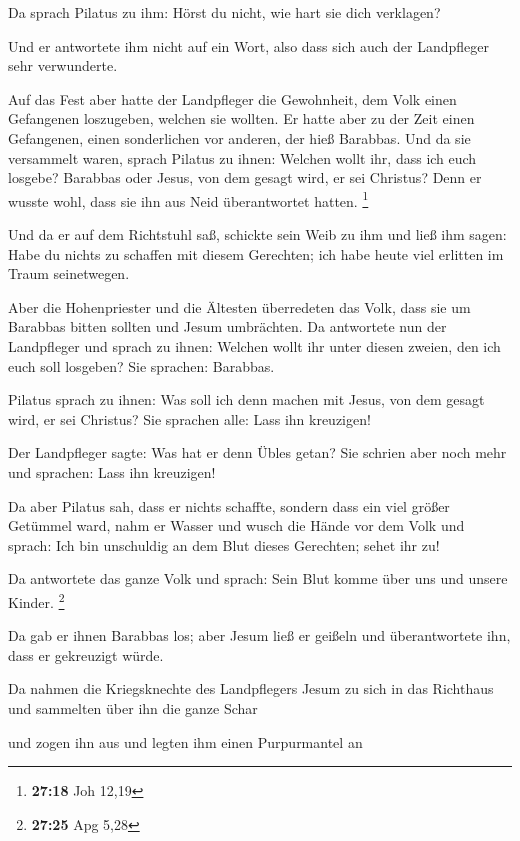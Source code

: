  Da sprach Pilatus zu ihm: Hörst du nicht, wie hart sie
dich verklagen?

 Und er antwortete ihm nicht auf ein Wort, also dass sich
auch der Landpfleger sehr verwunderte.

 Auf das Fest aber hatte der Landpfleger die Gewohnheit,
dem Volk einen Gefangenen loszugeben, welchen sie wollten. 
Er hatte aber zu der Zeit einen Gefangenen, einen sonderlichen vor
anderen, der hieß Barabbas.  Und da sie versammelt waren,
sprach Pilatus zu ihnen: Welchen wollt ihr, dass ich euch losgebe?
Barabbas oder Jesus, von dem gesagt wird, er sei Christus? 
Denn er wusste wohl, dass sie ihn aus Neid überantwortet hatten.
\footnote{\textbf{27:18} Joh 12,19}

 Und da er auf dem Richtstuhl saß, schickte sein Weib zu
ihm und ließ ihm sagen: Habe du nichts zu schaffen mit diesem Gerechten;
ich habe heute viel erlitten im Traum seinetwegen.

 Aber die Hohenpriester und die Ältesten überredeten das
Volk, dass sie um Barabbas bitten sollten und Jesum umbrächten.
 Da antwortete nun der Landpfleger und sprach zu ihnen:
Welchen wollt ihr unter diesen zweien, den ich euch soll losgeben? Sie
sprachen: Barabbas.

 Pilatus sprach zu ihnen: Was soll ich denn machen mit
Jesus, von dem gesagt wird, er sei Christus? Sie sprachen alle: Lass ihn
kreuzigen!

 Der Landpfleger sagte: Was hat er denn Übles getan? Sie
schrien aber noch mehr und sprachen: Lass ihn kreuzigen!

 Da aber Pilatus sah, dass er nichts schaffte, sondern dass
ein viel größer Getümmel ward, nahm er Wasser und wusch die Hände vor
dem Volk und sprach: Ich bin unschuldig an dem Blut dieses Gerechten;
sehet ihr zu!

 Da antwortete das ganze Volk und sprach: Sein Blut komme
über uns und unsere Kinder. \footnote{\textbf{27:25} Apg 5,28}

 Da gab er ihnen Barabbas los; aber Jesum ließ er geißeln
und überantwortete ihn, dass er gekreuzigt würde.

 Da nahmen die Kriegsknechte des Landpflegers Jesum zu sich
in das Richthaus und sammelten über ihn die ganze Schar

 und zogen ihn aus und legten ihm einen Purpurmantel an

